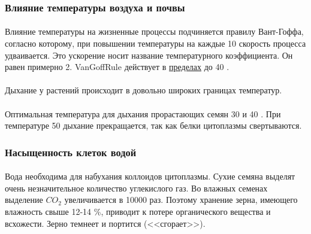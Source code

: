 \subsubsection*{Влияние температуры воздуха и почвы}


\paragraph*{}Влияние температуры на жизненные процессы подчиняется правилу Вант-Гоффа, согласно которому, при повышении температуры на каждые 10 \celsius скорость процесса удваивается. Это ускорение носит название температурного коэффициента. Он равен примерно 2. \gls{VanGoffRule} действует в \hyperlink{question_van_goff}{пределах} до 40 \celsius. 

\paragraph*{}Дыхание у растений происходит в довольно широких границах температур.


\paragraph*{}Оптимальная температура для дыхания прорастающих семян 30 и 40 \celsius. При температуре 50 \celsius дыхание прекращается, так как белки цитоплазмы свертываются.

\subsubsection*{Насыщенность клеток водой}

\paragraph*{}Вода необходима для набухания коллоидов цитоплазмы. 
Сухие семяна выделят очень незначительное количество углекислого газ. Во влажных семенах выделение $CO_{2}$ увеличивается в 10000 раз. Поэтому хранение зерна, имеющего влажность свыше 12-14 \%, приводит к потере органического вещества и всхожести. 
Зерно темнеет и портится (<<сгорает>>).


